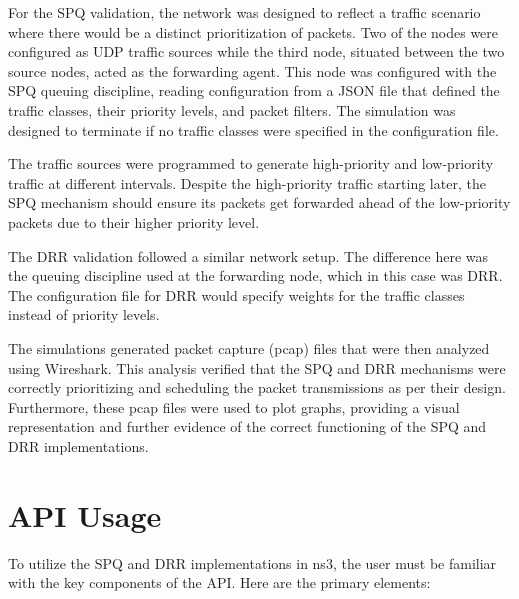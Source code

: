 \documentclass{article}
\begin{document}
For the SPQ validation, the network was designed to reflect a traffic scenario where there would be a distinct prioritization of packets. Two of the nodes were configured as UDP traffic sources while the third node, situated between the two source nodes, acted as the forwarding agent. This node was configured with the SPQ queuing discipline, reading configuration from a JSON file that defined the traffic classes, their priority levels, and packet filters. The simulation was designed to terminate if no traffic classes were specified in the configuration file.

The traffic sources were programmed to generate high-priority and low-priority traffic at different intervals. Despite the high-priority traffic starting later, the SPQ mechanism should ensure its packets get forwarded ahead of the low-priority packets due to their higher priority level.

The DRR validation followed a similar network setup. The difference here was the queuing discipline used at the forwarding node, which in this case was DRR. The configuration file for DRR would specify weights for the traffic classes instead of priority levels.

The simulations generated packet capture (pcap) files that were then analyzed using Wireshark. This analysis verified that the SPQ and DRR mechanisms were correctly prioritizing and scheduling the packet transmissions as per their design. Furthermore, these pcap files were used to plot graphs, providing a visual representation and further evidence of the correct functioning of the SPQ and DRR implementations.

\section{API Usage}

To utilize the SPQ and DRR implementations in ns3, the user must be familiar with the key components of the API. Here are the primary elements:
\end{document}
